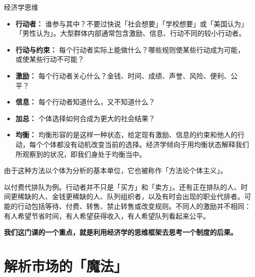 \documentclass[UTF8,10pt,a4paper,scheme=chinese,fontset=none]{ctexart}
\begin{document}
\begin{conceptbox}{经济学思维}
\begin{itemize}
  \item \textbf{行动者：} 谁参与其中？不要过快说「社会想要」「学校想要」或「美国认为」「男性认为」。大型群体内部通常包含激励、信息、行动不同的较小行动者。
  \item \textbf{行动与约束：} 每个行动者实际上能做什么？哪些规则使某些行动成为可能，或使某些行动不可能？
  \item \textbf{激励：} 每个行动者关心什么？金钱、时间、成绩、声誉、风险、便利、公平？
  \item \textbf{信息：} 每个行动者知道什么，又不知道什么？
  \item \textbf{加总：} 个体选择如何合成为更大的社会结果？
  \item \textbf{均衡：} 均衡形容的是这样一种状态，给定现有激励、信息的约束和他人的行动，每个个体都没有动机改变当前的选择。经济学倾向于用均衡状态解释我们所观察到的状况，即我们身处于均衡当中。
\end{itemize}

\end{conceptbox}

由于这种方法以个体为分析的基本单位，它也被称作「方法论个体主义」。

以付费代排队为例。行动者并不只是「买方」和「卖方」。还有正在排队的人、时间更稀缺的人、金钱更稀缺的人、队列组织者，以及有时会出现的职业代排者。可能的行动包括等待、付费、转售、禁止转售或改变规则。不同人的激励并不相同：有人希望节省时间，有人希望获得收入，有人希望队列看起来公平。

\textbf{我们这门课的一个重点，就是利用经济学的思维框架去思考一个制度的后果。}

  



\section{解析市场的「魔法」}
\end{document}
